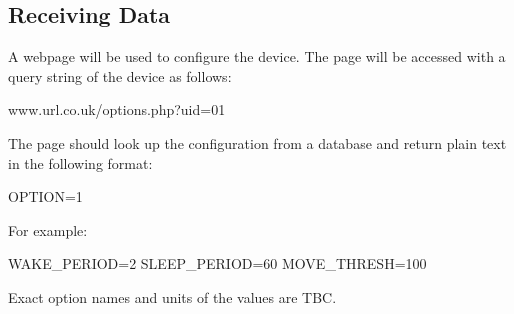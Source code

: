 \documentclass[12pt]{article}
\begin{document}
\subsection{Receiving Data}

A webpage will be used to configure the device.
The page will be accessed with a query string of the device as follows:

www.url.co.uk/options.php?uid=01

The page should look up the configuration from a database and return plain text in the following format:

OPTION=1

For example:

WAKE\_PERIOD=2
SLEEP\_PERIOD=60
MOVE\_THRESH=100


Exact option names and units of the values are TBC. 
\end{document}
